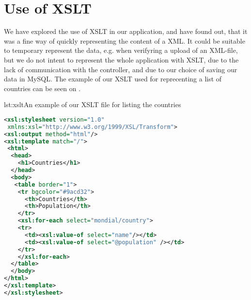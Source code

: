 \section{Use of XSLT}
We have explored the use of XSLT in our application, and have found out, that it was a fine way of quickly representing the content of a XML. It could be suitable to temporary represent the data, e.g. when verifyring a upload of an XML-file, but we do not intent to represent the whole application with XSLT, due to the lack of communication with the controller, and due to our choice of saving our data in MySQL.
The example of our XSLT used for reprecenting a list of countries can be seen on .
\begin{code}{lst:xslt}{An example of our XSLT file for listing the countries}
\begin{lstlisting}[language=XML]
<xsl:stylesheet version="1.0"
 xmlns:xsl="http://www.w3.org/1999/XSL/Transform">
<xsl:output method="html"/>
<xsl:template match="/">
 <html>
  <head>
    <h1>Countries</h1>
  </head>
  <body>
   <table border="1">
    <tr bgcolor="#9acd32">
      <th>Countries</th>
      <th>Population</th>
    </tr>
    <xsl:for-each select="mondial/country">
    <tr>
      <td><xsl:value-of select="name"/></td>
      <td><xsl:value-of select="@population" /></td>
    </tr>
    </xsl:for-each>
  </table>
  </body>
</html>
</xsl:template>
</xsl:stylesheet>
\end{lstlisting}
\end{code}